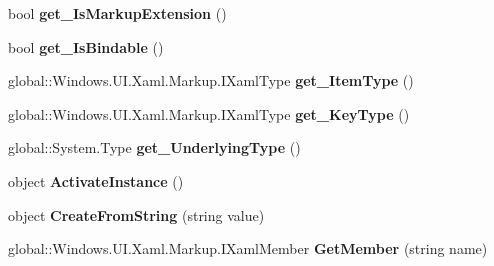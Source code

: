 \begin{DoxyCompactItemize}
bool {\bfseries get\+\_\+\+Is\+Markup\+Extension} ()
\item 
\mbox{\label{interface_windows_1_1_u_i_1_1_xaml_1_1_markup_1_1_i_xaml_type_a5d6ca2d2a8d5159df65277d6bc82b6ca}} 
bool {\bfseries get\+\_\+\+Is\+Bindable} ()
\item 
\mbox{\label{interface_windows_1_1_u_i_1_1_xaml_1_1_markup_1_1_i_xaml_type_a40ca59f3944675e6cdafc7f84915777e}} 
global\+::\+Windows.\+U\+I.\+Xaml.\+Markup.\+I\+Xaml\+Type {\bfseries get\+\_\+\+Item\+Type} ()
\item 
\mbox{\label{interface_windows_1_1_u_i_1_1_xaml_1_1_markup_1_1_i_xaml_type_adf5ffe349502daca52cf3769f1c7826b}} 
global\+::\+Windows.\+U\+I.\+Xaml.\+Markup.\+I\+Xaml\+Type {\bfseries get\+\_\+\+Key\+Type} ()
\item 
\mbox{\label{interface_windows_1_1_u_i_1_1_xaml_1_1_markup_1_1_i_xaml_type_a83f6b45dec1d61427a84b05e9ba9dbfd}} 
global\+::\+System.\+Type {\bfseries get\+\_\+\+Underlying\+Type} ()
\item 
\mbox{\label{interface_windows_1_1_u_i_1_1_xaml_1_1_markup_1_1_i_xaml_type_a808e756aefac346cce2c570d35eb1f2d}} 
object {\bfseries Activate\+Instance} ()
\item 
\mbox{\label{interface_windows_1_1_u_i_1_1_xaml_1_1_markup_1_1_i_xaml_type_a510acbfd71efcb451b2b8f31416e9d57}} 
object {\bfseries Create\+From\+String} (string value)
\item 
\mbox{\label{interface_windows_1_1_u_i_1_1_xaml_1_1_markup_1_1_i_xaml_type_a431f90f38a00401842b28f5ee3917d54}} 
global\+::\+Windows.\+U\+I.\+Xaml.\+Markup.\+I\+Xaml\+Member {\bfseries Get\+Member} (string name)
\item 
\mbox{\label{interface_windows_1_1_u_i_1_1_xaml_1_1_markup_1_1_i_xaml_type_a9542f31b1f9a3d9698ca632ae1a207e2}} 

\end{DoxyCompactItemize}
